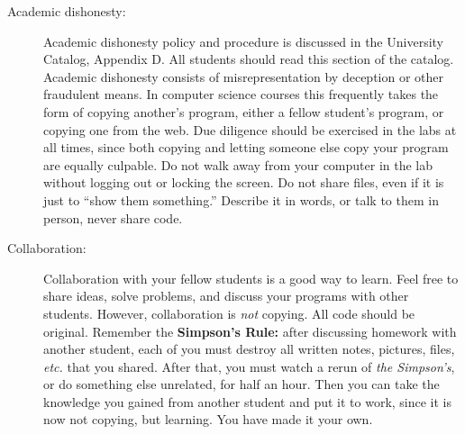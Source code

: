 \documentclass{article}
\begin{document}
\begin{description}
\item[Academic dishonesty:] Academic dishonesty policy and
  procedure is discussed in the University Catalog, Appendix D.  All
  students should read this section of the catalog.  Academic
  dishonesty consists of misrepresentation by deception or other
  fraudulent means.  In computer science courses this frequently takes
  the form of copying another's program, either a fellow student's
  program, or copying one from the web.  Due diligence should be
  exercised in the labs at all times, since both copying and letting
  someone else copy your program are equally culpable.  Do not walk
  away from your computer in the lab without logging out or locking
  the screen.  Do not share files, even if it is just to ``show them
  something.''  Describe it in words, or talk to them in person, never
  share code.

\item[Collaboration:] Collaboration with your fellow students is
  a good way to learn.  Feel free to share ideas, solve problems, and
  discuss your programs with other students.  However, collaboration
  is {\em not} copying.  All code should be original.  Remember the
  {\bf Simpson's Rule:} after discussing homework with another
  student, each of you must destroy all written notes, pictures,
  files, {\em etc.} that you shared.  After that, you must watch a
  rerun of {\em the Simpson's}, or do something else unrelated, for
  half an hour.  Then you can take the knowledge you gained from
  another student and put it to work, since it is now not copying, but
  learning.  You have made it your own.




\end{description}
\end{document}
